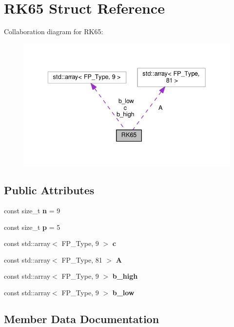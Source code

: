 \hypertarget{structRK65}{}\section{R\+K65 Struct Reference}
\label{structRK65}


Collaboration diagram for R\+K65\+:\nopagebreak
\begin{figure}[H]
\begin{center}
\leavevmode
\includegraphics[width=336pt]{structRK65__coll__graph}
\end{center}
\end{figure}
\subsection*{Public Attributes}
\begin{DoxyCompactItemize}
\item 
\mbox{\label{structRK65_ad00bda06b6a7c74d83b34c2af2249df9}} 
const size\+\_\+t {\bfseries n} = 9
\item 
\mbox{\label{structRK65_aa74cc748421b30c372777ae98ead9404}} 
const size\+\_\+t {\bfseries p} = 5
\item 
const std\+::array$<$ F\+P\+\_\+\+Type, 9 $>$ {\bfseries c}
\item 
const std\+::array$<$ F\+P\+\_\+\+Type, 81 $>$ {\bfseries A}
\item 
const std\+::array$<$ F\+P\+\_\+\+Type, 9 $>$ {\bfseries b\+\_\+high}
\item 
const std\+::array$<$ F\+P\+\_\+\+Type, 9 $>$ {\bfseries b\+\_\+low}
\end{DoxyCompactItemize}


\subsection{Member Data Documentation}
\mbox{\label{structRK65_a54dd53be90cfb257d7739443220c833f}} 
